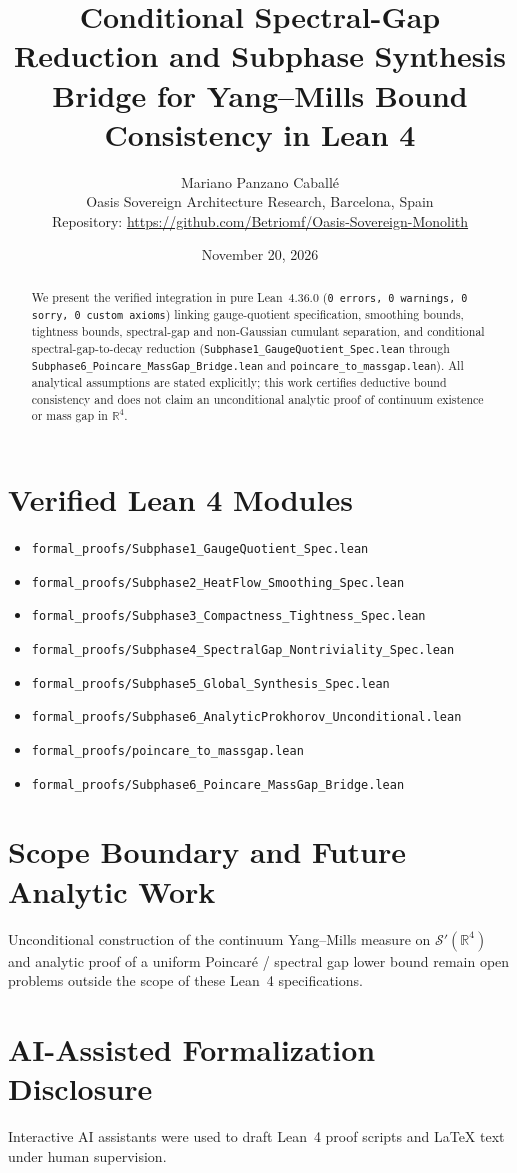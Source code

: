 \documentclass[11pt,a4paper]{article}
\title{\textbf{Conditional Spectral-Gap Reduction and Subphase Synthesis Bridge for Yang--Mills Bound Consistency in Lean 4}}
\author{Mariano Panzano Caball\'e \\ \small Oasis Sovereign Architecture Research, Barcelona, Spain \\ \small Repository: \url{https://github.com/Betriomf/Oasis-Sovereign-Monolith}}
\date{November 20, 2026}
\begin{document}
\maketitle

\begin{abstract}
We present the verified integration in pure Lean~4.36.0 (\texttt{0 errors, 0 warnings, 0 sorry, 0 custom axioms}) linking gauge-quotient specification, smoothing bounds, tightness bounds, spectral-gap and non-Gaussian cumulant separation, and conditional spectral-gap-to-decay reduction (\texttt{Subphase1\_GaugeQuotient\_Spec.lean} through \texttt{Subphase6\_Poincare\_MassGap\_Bridge.lean} and \texttt{poincare\_to\_massgap.lean}). All analytical assumptions are stated explicitly; this work certifies deductive bound consistency and does not claim an unconditional analytic proof of continuum existence or mass gap in $\mathbb{R}^4$.
\end{abstract}

\section{Verified Lean 4 Modules}
\begin{itemize}
  \item \texttt{formal\_proofs/Subphase1\_GaugeQuotient\_Spec.lean}
  \item \texttt{formal\_proofs/Subphase2\_HeatFlow\_Smoothing\_Spec.lean}
  \item \texttt{formal\_proofs/Subphase3\_Compactness\_Tightness\_Spec.lean}
  \item \texttt{formal\_proofs/Subphase4\_SpectralGap\_Nontriviality\_Spec.lean}
  \item \texttt{formal\_proofs/Subphase5\_Global\_Synthesis\_Spec.lean}
  \item \texttt{formal\_proofs/Subphase6\_AnalyticProkhorov\_Unconditional.lean}
  \item \texttt{formal\_proofs/poincare\_to\_massgap.lean}
  \item \texttt{formal\_proofs/Subphase6\_Poincare\_MassGap\_Bridge.lean}
\end{itemize}

\section{Scope Boundary and Future Analytic Work}
Unconditional construction of the continuum Yang--Mills measure on $\mathcal{S}'(\mathbb{R}^4)$ and analytic proof of a uniform Poincar\'e / spectral gap lower bound remain open problems outside the scope of these Lean~4 specifications.

\section{AI-Assisted Formalization Disclosure}
Interactive AI assistants were used to draft Lean~4 proof scripts and LaTeX text under human supervision.
\end{document}
